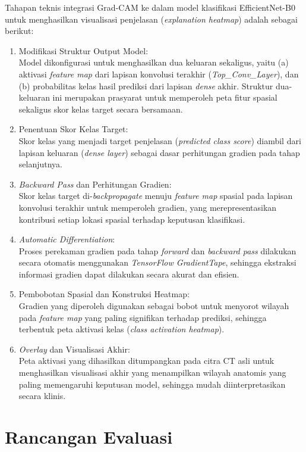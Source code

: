 Tahapan teknis integrasi Grad-CAM ke dalam model klasifikasi EfficientNet-B0 untuk menghasilkan visualisasi penjelasan (\textit{explanation heatmap}) adalah sebagai berikut:
\begin{enumerate}
	\item Modifikasi Struktur Output Model: \\ Model dikonfigurasi untuk menghasilkan dua keluaran sekaligus, yaitu (a) aktivasi \textit{feature map} dari lapisan konvolusi terakhir (\textit{Top\_Conv\_Layer}), dan (b) probabilitas kelas hasil prediksi dari lapisan \textit{dense} akhir. Struktur dua-keluaran ini merupakan prasyarat untuk memperoleh peta fitur spasial sekaligus skor kelas target secara bersamaan.
	\item Penentuan Skor Kelas Target: \\ Skor kelas yang menjadi target penjelasan (\textit{predicted class score}) diambil dari lapisan keluaran (\textit{dense layer}) sebagai dasar perhitungan gradien pada tahap selanjutnya.
	\item \textit{Backward Pass} dan Perhitungan Gradien: \\ Skor kelas target di-\textit{backpropagate} menuju \textit{feature map} spasial pada lapisan konvolusi terakhir untuk memperoleh gradien, yang merepresentasikan kontribusi setiap lokasi spasial terhadap keputusan klasifikasi.
	\item \textit{Automatic Differentiation}: \\ Proses perekaman gradien pada tahap \textit{forward} dan \textit{backward pass} dilakukan secara otomatis menggunakan \textit{TensorFlow GradientTape}, sehingga ekstraksi informasi gradien dapat dilakukan secara akurat dan efisien.
	\item Pembobotan Spasial dan Konstruksi Heatmap: \\ Gradien yang diperoleh digunakan sebagai bobot untuk menyorot wilayah pada \textit{feature map} yang paling signifikan terhadap prediksi, sehingga terbentuk peta aktivasi kelas (\textit{class activation heatmap}).
	\item \textit{Overlay} dan Visualisasi Akhir: \\ Peta aktivasi yang dihasilkan ditumpangkan pada citra CT asli untuk menghasilkan visualisasi akhir yang menampilkan wilayah anatomis yang paling memengaruhi keputusan model, sehingga mudah diinterpretasikan secara klinis.
\end{enumerate}

\section{Rancangan Evaluasi}
